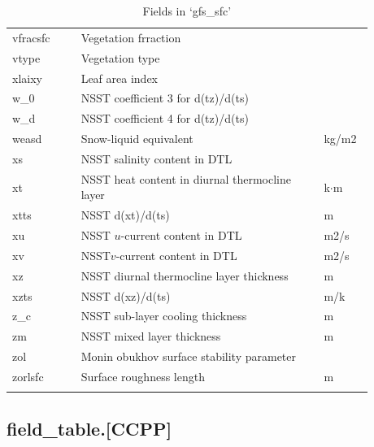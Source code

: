\documentclass[11pt,fleqn]{report}              %
\begin{document}
\begin{enumerate}
\begin{enumerate}
{\begin{longtable}{p{0.17\linewidth} | p{0.6\linewidth} | p{0.11\linewidth} }
vfracsfc &  Vegetation frraction & \\
vtype  & Vegetation type & \\
xlaixy &  Leaf area index & \\
w\_0  & NSST coefficient 3 for d(tz)/d(ts) & \\
w\_d  & NSST coefficient 4 for d(tz)/d(ts) & \\
weasd  & Snow-liquid equivalent  & kg/m2 \\
xs  & NSST salinity content in DTL & \\
xt  & NSST heat content in diurnal thermocline layer & k$\cdot$m  \\
xtts  & NSST d(xt)/d(ts) & m \\
xu  & NSST $u$-current content in DTL & m2/s \\
xv  & NSST$v$-current content in DTL & m2/s  \\
xz  & NSST diurnal thermocline layer thickness & m \\
xzts  & NSST d(xz)/d(ts) & m/k \\
z\_c  & NSST sub-layer cooling thickness & m \\
zm & NSST mixed layer thickness & m \\
zol  & Monin obukhov surface stability parameter & \\
zorlsfc  & Surface roughness length & m  \\  
\hline
\caption{Fields in `gfs\_sfc'}
\label{table:fv3_fld_gfssfc}
\end{longtable}
}

\end{enumerate}

\end{enumerate}



\subsection{field\_table.[CCPP]}
\label{subsec:field_table}
\end{document}
